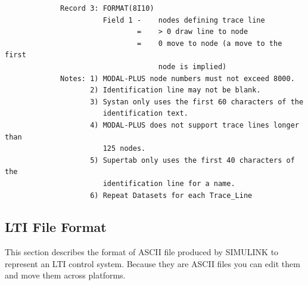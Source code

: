 \documentclass[10pt,openany,twoside]{book}
\numberwithin{equation}{section}   %
\begin{document}
\begin{verbatim}
             Record 3: FORMAT(8I10)
                       Field 1 -    nodes defining trace line
                               =    > 0 draw line to node
                               =    0 move to node (a move to the first
                                    node is implied)
             Notes: 1) MODAL-PLUS node numbers must not exceed 8000.
                    2) Identification line may not be blank.
                    3) Systan only uses the first 60 characters of the
                       identification text.
                    4) MODAL-PLUS does not support trace lines longer than
                       125 nodes.
                    5) Supertab only uses the first 40 characters of the
                       identification line for a name.
                    6) Repeat Datasets for each Trace_Line

\end{verbatim}

\subsection{LTI File Format}\label{sect:ABCD-file}
This section describes the format of ASCII file produced by SIMULINK
to represent an LTI control system.
Because they are ASCII files
you can edit them and move them across platforms.
\end{document}
